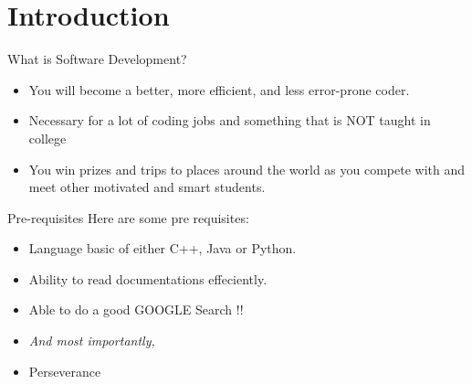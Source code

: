 \section{Introduction}
    \begin{frame}{What is Software Development?}
        \begin{itemize}
            \item<+-> You will become a better, more efficient, and less error-prone coder.
            \item<+-> Necessary for a lot of coding jobs and something that is NOT taught in college            
            \item<+-> You win prizes and trips to places around the world as you compete with and meet other motivated and smart students.
        \end{itemize}
    \end{frame}
    \begin{frame}{Pre-requisites}
        Here are some pre requisites:
        \pause
        \begin{itemize}
            \item<+-> Language basic of either C++, Java or Python.
            \item<+-> Ability to read documentations effeciently.
            \item<+-> Able to do a good GOOGLE Search !!            
            \item<+->[] \textit{And most importantly,}
            \item<+-> Perseverance
        \end{itemize}
    \end{frame}

